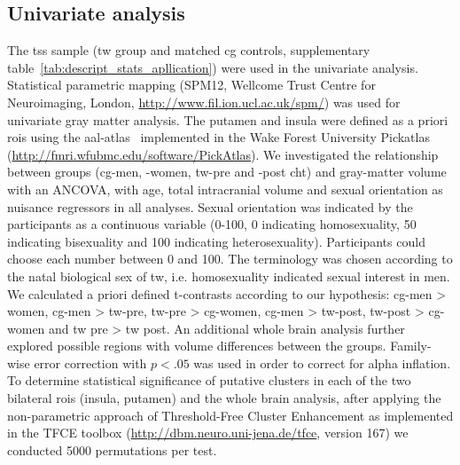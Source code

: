 \documentclass{article}
\begin{document}
    \subsection{Univariate analysis}
    \label{subsec:analysis_univariat}
    The \ac{tss} sample (\ac{tw} group and matched \ac{cg} controls, supplementary table~\ref{tab:descript_stats_apllication}) were used in the univariate analysis. Statistical parametric mapping (SPM12, Wellcome Trust Centre for Neuroimaging, London, \url{http://www.fil.ion.ucl.ac.uk/spm/}) was used for univariate gray matter analysis. The putamen and insula were defined as a priori \acp{roi} using the aal-atlas~\cite{Tzourio-Mazoyer2002} implemented in the Wake Forest University Pickatlas (\url{http://fmri.wfubmc.edu/software/PickAtlas}). We investigated the relationship between groups (\ac{cg}-men, -women, \ac{tw}-pre and -post \ac{cht}) and gray-matter volume with an ANCOVA, with age, total intracranial volume and sexual orientation as nuisance regressors in all analyses. Sexual orientation was indicated by the participants as a continuous variable (0-100, 0 indicating homosexuality, 50 indicating bisexuality and 100 indicating heterosexuality). Participants could choose each number between 0 and 100. The terminology was chosen according to the natal biological sex of \ac{tw}, i.e. homosexuality indicated sexual interest in men.
    We calculated a priori defined t-contrasts according to our hypothesis: \ac{cg}-men > women, \ac{cg}-men > \ac{tw}-pre, \ac{tw}-pre > \ac{cg}-women, \ac{cg}-men > \ac{tw}-post, \ac{tw}-post > \ac{cg}-women and \ac{tw} pre > \ac{tw} post. An additional whole brain analysis further explored possible regions with volume differences between the groups. Family-wise error correction with $p < .05$ was used in order to correct for alpha inflation. To determine statistical significance of putative clusters in each of the two bilateral \acp{roi} (insula, putamen) and the whole brain analysis, after applying the non-parametric approach of Threshold-Free Cluster Enhancement as implemented in the TFCE toolbox (\url{http://dbm.neuro.uni-jena.de/tfce}, version 167) we conducted 5000 permutations per test.
\end{document}
